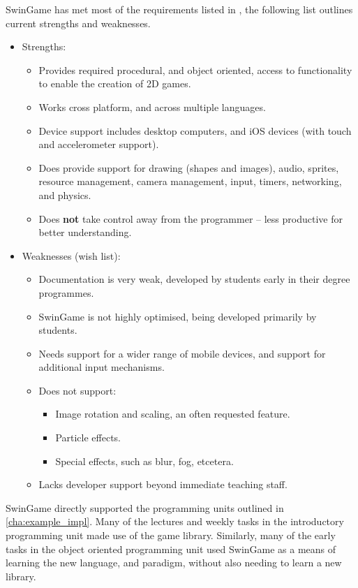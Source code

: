 SwinGame has met most of the requirements listed in , the following list outlines current strengths and weaknesses.
\begin{itemize}[noitemsep,nolistsep]
  \item Strengths:
  \begin{itemize}
    \item Provides required procedural, and object oriented, access to functionality to enable the creation of 2D games.
    \item Works cross platform, and across multiple languages.
    \item Device support includes desktop computers, and iOS devices (with touch and accelerometer support).
    \item Does provide support for drawing (shapes and images), audio, sprites, resource management, camera management, input, timers, networking, and physics.
    \item Does \textbf{not} take control away from the programmer -- less productive for better understanding.
  \end{itemize}
  \item Weaknesses (wish list):
  \begin{itemize}
    \item Documentation is very weak, developed by students early in their degree programmes.
    \item SwinGame is not highly optimised, being developed primarily by students.
    \item Needs support for a wider range of mobile devices, and support for additional input mechanisms.
    \item Does not support:
    \begin{itemize}[noitemsep,nolistsep]
      \item Image rotation and scaling, an often requested feature.
      \item Particle effects.
      \item Special effects, such as blur, fog, etcetera.
    \end{itemize}
    \item Lacks developer support beyond immediate teaching staff.
  \end{itemize}
\end{itemize}

SwinGame directly supported the programming units outlined in \cref{cha:example_impl}. Many of the lectures and weekly tasks in the introductory programming unit made use of the game library. Similarly, many of the early tasks in the object oriented programming unit used SwinGame as a means of learning the new language, and paradigm, without also needing to learn a new library. 


